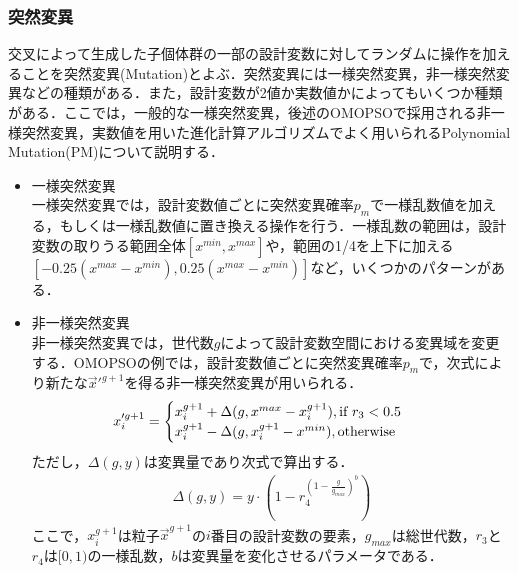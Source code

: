 \subsubsection{突然変異}
交叉によって生成した子個体群の一部の設計変数に対してランダムに操作を加えることを突然変異(Mutation)とよぶ．突然変異には一様突然変異，非一様突然変異などの種類がある．また，設計変数が2値か実数値かによってもいくつか種類がある．ここでは，一般的な一様突然変異，後述のOMOPSOで採用される非一様突然変異，実数値を用いた進化計算アルゴリズムでよく用いられるPolynomial Mutation(PM)について説明する．

\begin{itemize}
    \item 一様突然変異\\
          一様突然変異では，設計変数値ごとに突然変異確率$p_m$で一様乱数値を加える，もしくは一様乱数値に置き換える操作を行う．一様乱数の範囲は，設計変数の取りうる範囲全体$[x^{min}, x^{max}]$や，範囲の1/4を上下に加える$[-0.25(x^{max}- x^{min}), 0.25(x^{max}- x^{min})]$など，いくつかのパターンがある．

    \item 非一様突然変異\cite{Esquivel03}\\
          非一様突然変異では，世代数$g$によって設計変数空間における変異域を変更する．OMOPSOの例では，設計変数値ごとに突然変異確率$p_m$で，次式により新たな$\vec{x}'^{g+1}$を得る非一様突然変異が用いられる．
          \begin{align}
              \small
              x'^{g+1}_i & =
              \begin{cases}
                  x^{g+1}_i+\Delta(g, x^{max}-x^{g+1}_i), \text{if } r_3 < 0.5 & \\
                  x^{g+1}_i-\Delta(g, x^{g+1}_i-x^{min}), \text{otherwise}     & \\
              \end{cases}
              \label{eq::theory_mutation_nonuni}
          \end{align}
          ただし，$\Delta(g, y)$は変異量であり次式で算出する．
          \begin{align}
              \Delta(g, y) = y\cdot\left(1-r^{\left(1-\frac{g}{g_{max}}\right)^b}_4\right)
          \end{align}
          ここで，$x^{g+1}_i$は粒子$\vec{x}^{g+1}$の$i$番目の設計変数の要素，$g_{max}$は総世代数，$r_3$と$r_4$は$[0, 1)$の一様乱数，$b$は変異量を変化させるパラメータである．


\end{itemize}
